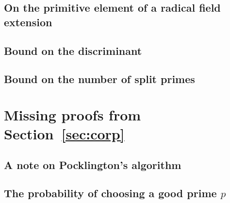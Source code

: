 \documentclass[reqno,a4paper]{amsart}
\begin{document}
\subsection{On the primitive element of a radical field extension}\label{appendix:primitive_element}


\subsection{Bound on the discriminant}\label{appendix:discriminant}


\subsection{Bound on the number of split primes}\label{appendix:bound_number_of_primes}


\section{Missing proofs from Section~\ref{sec:corp}}
\label{appendix:corp}

\subsection{A note on Pocklington's algorithm}\label{appendix:pocklington}


\subsection{The probability of choosing a good prime $p$}\label{appendix:probability_good_prime}

\end{document}
